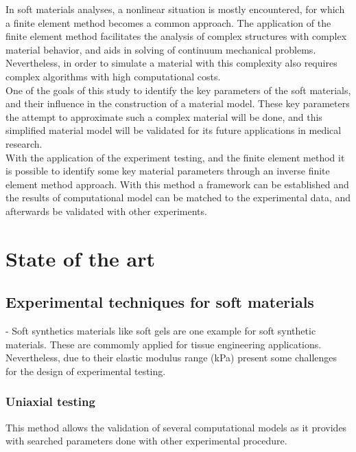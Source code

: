 In soft materials analyses, a nonlinear situation is mostly encountered, for which a finite 
element method becomes a common approach. The application of the finite element method
 facilitates the analysis of complex structures with complex material behavior, and aids in 
 solving of continuum mechanical problems. Nevertheless, in order to simulate a material with 
 this complexity also requires complex algorithms with high computational costs. \\
 
One of the goals of this study to identify the key parameters of the soft materials, and their 
influence in the construction of a material model. These key parameters the attempt to 
 approximate such a complex material will be done, and this simplified material model will be 
 validated for its future applications in medical research.\\
 
 With the application of the experiment testing, and the finite element method it is possible 
 to identify some key material parameters through an inverse finite element method approach. With this 
 method a framework can be established and the results of computational model can be matched 
 to the experimental data, and afterwards be validated with other experiments.

\section{State of the art}

\subsection{Experimental techniques for soft materials}


- Soft synthetics materials like soft gels are one example for soft synthetic materials. These
are commomly applied for tissue engineering applications. Nevertheless, due to their elastic 
modulus range (kPa) present some challenges for the design of experimental testing\cite{Liu2009}.

\subsubsection{Uniaxial testing}
This method allows the validation of several computational models as it provides with
 searched parameters done with other experimental procedure. 

